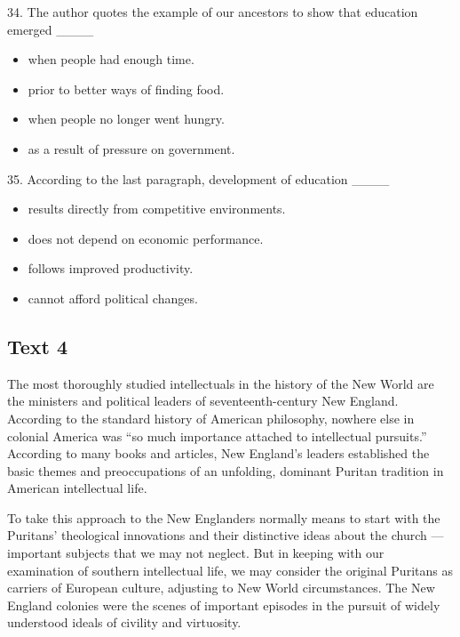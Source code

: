 \documentclass[UTF8,11pt]{ctexart}
\begin{document}
34. The author quotes the example of our ancestors to show that education emerged \_\_\_\_


\begin{itemize}[leftmargin=2em,itemsep=.2em,topsep=.4em]\item[A.] when people had enough time.
\item[B.] prior to better ways of finding food.
\item[C.] when people no longer went hungry.
\item[D.] as a result of pressure on government.
\end{itemize}

35. According to the last paragraph, development of education \_\_\_\_


\begin{itemize}[leftmargin=2em,itemsep=.2em,topsep=.4em]\item[A.] results directly from competitive environments.
\item[B.] does not depend on economic performance.
\item[C.] follows improved productivity.
\item[D.] cannot afford political changes.
\end{itemize}

\subsection*{\textbf{Text 4}}


The most thoroughly studied intellectuals in the history of the New World are the ministers and political leaders of seventeenth-century New England. According to the standard history of American philosophy, nowhere else in colonial America was “so much importance attached to intellectual pursuits.” According to many books and articles, New England’s leaders established the basic themes and preoccupations of an unfolding, dominant Puritan tradition in American intellectual life.


To take this approach to the New Englanders normally means to start with the Puritans’ theological innovations and their distinctive ideas about the church — important subjects that we may not neglect. But in keeping with our examination of southern intellectual life, we may consider the original Puritans as carriers of European culture, adjusting to New World circumstances. The New England colonies were the scenes of important episodes in the pursuit of widely understood ideals of civility and virtuosity.
\end{document}
